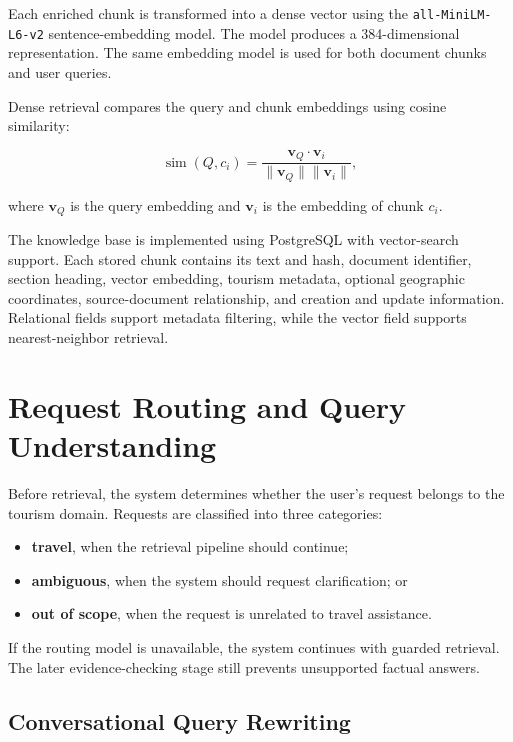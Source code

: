 Each enriched chunk is transformed into a dense vector using the
\texttt{all-MiniLM-L6-v2} sentence-embedding model. The model produces a
384-dimensional representation. The same embedding model is used for both
document chunks and user queries.

Dense retrieval compares the query and chunk embeddings using cosine
similarity:

\begin{equation}
\operatorname{sim}(Q,c_i)
=
\frac{\mathbf{v}_Q \cdot \mathbf{v}_i}
{\lVert\mathbf{v}_Q\rVert\lVert\mathbf{v}_i\rVert},
\end{equation}

where $\mathbf{v}_Q$ is the query embedding and $\mathbf{v}_i$ is the
embedding of chunk $c_i$.

The knowledge base is implemented using PostgreSQL with vector-search support.
Each stored chunk contains its text and hash, document identifier, section
heading, vector embedding, tourism metadata, optional geographic coordinates,
source-document relationship, and creation and update information. Relational
fields support metadata filtering, while the vector field supports
nearest-neighbor retrieval.

\section{Request Routing and Query Understanding}

Before retrieval, the system determines whether the user's request belongs to
the tourism domain. Requests are classified into three categories:

\begin{itemize}
    \item \textbf{travel}, when the retrieval pipeline should continue;
    \item \textbf{ambiguous}, when the system should request clarification; or
    \item \textbf{out of scope}, when the request is unrelated to travel
    assistance.
\end{itemize}

If the routing model is unavailable, the system continues with guarded
retrieval. The later evidence-checking stage still prevents unsupported factual
answers.

\subsection{Conversational Query Rewriting}


